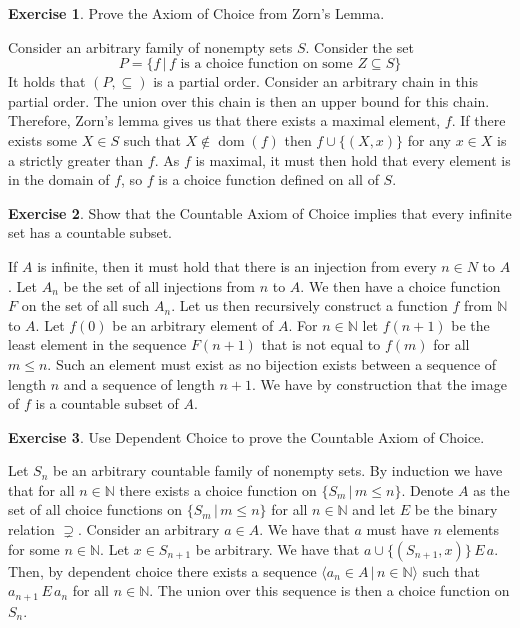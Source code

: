 \documentclass{article}
\theoremstyle{definition}
\newtheorem{exer}{Exercise}[section]
\newcommand{\N}{\mathbb{N}}
\DeclareMathOperator{\dom}{dom}
\newlength{\defparindent}
\newenvironment{answer}
    {\begin{mdframed}[backgroundcolor=gray!15, linewidth=0pt] \setlength{\parindent}{\defparindent}}
    {\end{mdframed}}
\begin{document}
\begin{exer}
    Prove the Axiom of Choice from Zorn's Lemma.
    \begin{answer}
        Consider an arbitrary family of nonempty sets $S$. Consider the set 
        \[
            P = \{f \, | \, \text{$f$ is a choice function on some $Z \subseteq S$} \}
        \]
        It holds that $(P, \subseteq)$ is a partial order. Consider an arbitrary chain in this partial order. The union over this chain is then an upper bound for this chain. Therefore, Zorn's lemma gives us that there exists a maximal element, $f$. If there exists some $X \in S$ such that $X \not\in \dom(f)$ then $f \cup \{(X, x)\}$ for any $x \in X$ is a strictly greater than $f$. As $f$ is maximal, it must then hold that every element is in the domain of $f$, so $f$ is a choice function defined on all of $S$.  
    \end{answer}
\end{exer}

\newpage

\begin{exer}
    Show that the Countable Axiom of Choice implies that every infinite set has a countable subset.
    \begin{answer}
        If $A$ is infinite, then it must hold that there is an injection from every $n \in N$ to $A$. Let $A_n$ be the set of all injections from $n$ to $A$. We then have a choice function $F$ on the set of all such $A_n$. Let us then recursively construct a function $f$ from $\N$ to $A$. Let $f(0)$ be an arbitrary element of $A$. For $n \in \N$ let $f(n + 1)$ be the least element in the sequence $F(n + 1)$ that is not equal to $f(m)$ for all $m \le n$. Such an element must exist as no bijection exists between a sequence of length $n$ and a sequence of length $n + 1$. We have by construction that the image of $f$ is a countable subset of $A$.
    \end{answer}  
\end{exer}

\begin{exer}
    Use Dependent Choice to prove the Countable Axiom of Choice.
    \begin{answer}
        Let $S_n$ be an arbitrary countable family of nonempty sets. By induction we have that for all $n \in \N$ there exists a choice function on $\{S_m \, | \, m \le n \}$. Denote $A$ as the set of all choice functions on $\{S_m \, | \, m \le n \}$ for all $n \in \N$ and let $E$ be the binary relation $\supsetneq$. Consider an arbitrary $a \in A$. We have that $a$ must have $n$ elements for some $n \in \N$. Let $x \in S_{n + 1}$ be arbitrary. We have that $a \cup \{(S_{n + 1}, x)\} \, E \, a$. Then, by dependent choice there exists a sequence $\langle a_n \in A \, | \, n \in \N \rangle$ such that $a_{n + 1} \, E \, a_n$ for all $n \in \N$. The union over this sequence is then a choice function on $S_n$.
    \end{answer}
\end{exer}
\end{document}

